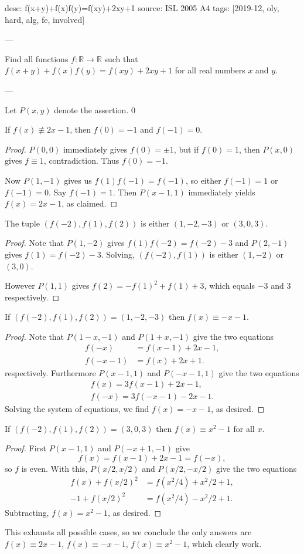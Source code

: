 desc: f(x+y)+f(x)f(y)=f(xy)+2xy+1
source: ISL 2005 A4
tags: [2019-12, oly, hard, alg, fe, involved]

---

Find all functions $f:\mathbb R\to\mathbb R$ such that $f(x+y)+f(x)f(y)=f(xy)+2xy+1$ for all real numbers $x$ and $y$.

---

Let $P(x,y)$ denote the assertion.
\setcounter{claim}0
\begin{claim}
    If $f(x)\not\equiv2x-1$, then $f(0)=-1$ and $f(-1)=0$.
\end{claim}
\begin{proof}
    $P(0,0)$ immediately gives $f(0)=\pm1$, but if $f(0)=1$, then $P(x,0)$ gives $f\equiv1$, contradiction. Thus $f(0)=-1$.

    Now $P(1,-1)$ gives us $f(1)f(-1)=f(-1)$, so either $f(-1)=1$ or $f(-1)=0$. Say $f(-1)=1$. Then $P(x-1,1)$ immediately yields $f(x)=2x-1$, as claimed.
\end{proof}
\begin{claim}
    The tuple $(f(-2),f(1),f(2))$ is either $(1,-2,-3)$ or $(3,0,3)$.
\end{claim}
\begin{proof}
    Note that $P(1,-2)$ gives $f(1)f(-2)=f(-2)-3$ and $P(2,-1)$ gives $f(1)=f(-2)-3$. Solving, $(f(-2),f(1))$ is either $(1,-2)$ or $(3,0)$.

    However $P(1,1)$ gives $f(2)=-f(1)^2+f(1)+3$, which equals $-3$ and $3$ respectively.
\end{proof}
\begin{claim}
    If $(f(-2),f(1),f(2))=(1,-2,-3)$ then $f(x)\equiv-x-1$.
\end{claim}
\begin{proof}
    Note that $P(1-x,-1)$ and $P(1+x,-1)$ give the two equations
    \begin{align*}
        f(-x)&=f(x-1)+2x-1,\\
        f(-x-1)&=f(x)+2x+1.
    \end{align*}
    respectively. Furthermore $P(x-1,1)$ and $P(-x-1,1)$ give the two equations
    \begin{align*}
        f(x)=3f(x-1)+2x-1,\\
        f(-x)=3f(-x-1)-2x-1.
    \end{align*}
    Solving the system of equations, we find $f(x)=-x-1$, as desired.
\end{proof}
\begin{claim}
    If $(f(-2),f(1),f(2))=(3,0,3)$ then $f(x)\equiv x^2-1$ for all $x$.
\end{claim}
\begin{proof}
    First $P(x-1,1)$ and $P(-x+1,-1)$ give \[f(x)=f(x-1)+2x-1=f(-x),\]
    so $f$ is even. With this, $P(x/2,x/2)$ and $P(x/2,-x/2)$ give the two equations
    \begin{align*}
        f(x)+f(x/2)^2&=f(x^2/4)+x^2/2+1,\\
        -1+f(x/2)^2&=f(x^2/4)-x^2/2+1.
    \end{align*}
    Subtracting, $f(x)=x^2-1$, as desired.
\end{proof}

This exhausts all possible cases, so we conclude the only answers are $f(x)\equiv2x-1$, $f(x)\equiv-x-1$, $f(x)\equiv x^2-1$, which clearly work.

